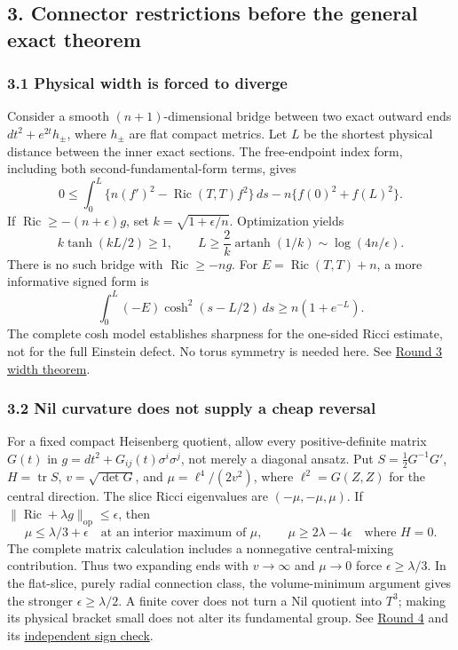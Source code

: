 \documentclass[
  english,
]{article}
\begin{document}
\hypertarget{connector-restrictions-before-the-general-exact-theorem}{%
\subsection{3. Connector restrictions before the general exact
theorem}\label{connector-restrictions-before-the-general-exact-theorem}}

\hypertarget{physical-width-is-forced-to-diverge}{%
\subsubsection{3.1 Physical width is forced to
diverge}\label{physical-width-is-forced-to-diverge}}

Consider a smooth \((n+1)\)-dimensional bridge between two exact outward
ends \(dt^2+e^{2t}h_\pm\), where \(h_\pm\) are flat compact metrics. Let
\(L\) be the shortest physical distance between the inner exact
sections. The free-endpoint index form, including both
second-fundamental-form terms, gives \[
 0\le\int_0^L\{n(f')^2-\operatorname{Ric}(T,T)f^2\}\,ds
       -n\{f(0)^2+f(L)^2\}.
\] If \(\operatorname{Ric}\ge-(n+\epsilon)g\), set
\(k=\sqrt{1+\epsilon/n}\). Optimization yields \[
 k\tanh(kL/2)\ge1,\qquad
 L\ge\frac2k\operatorname{artanh}(1/k)
       \sim\log(4n/\epsilon).
\] There is no such bridge with \(\operatorname{Ric}\ge-ng\). For
\(E=\operatorname{Ric}(T,T)+n\), a more informative signed form is \[
 \int_0^L(-E)\cosh^2(s-L/2)\,ds\ge n(1+e^{-L}).
\] The complete cosh model establishes sharpness for the one-sided Ricci
estimate, not for the full Einstein defect. No torus symmetry is needed
here. See \href{../proofs/round3_global.md}{Round 3 width theorem}.

\hypertarget{nil-curvature-does-not-supply-a-cheap-reversal}{%
\subsubsection{3.2 Nil curvature does not supply a cheap
reversal}\label{nil-curvature-does-not-supply-a-cheap-reversal}}

For a fixed compact Heisenberg quotient, allow every positive-definite
matrix \(G(t)\) in \(g=dt^2+G_{ij}(t)\sigma^i\sigma^j\), not merely a
diagonal ansatz. Put \(S=\frac12G^{-1}G'\), \(H=\operatorname{tr}S\),
\(v=\sqrt{\det G}\), and \(\mu=\ell^4/(2v^2)\), where \(\ell^2=G(Z,Z)\)
for the central direction. The slice Ricci eigenvalues are
\((-\mu,-\mu,\mu)\). If
\(\|\operatorname{Ric}+\lambda g\|_{\mathrm{op}}\le\epsilon\), then \[
 \mu\le\lambda/3+\epsilon\quad\text{at an interior maximum of }\mu,
 \qquad
 \mu\ge2\lambda-4\epsilon\quad\text{where }H=0.
\] The complete matrix calculation includes a nonnegative central-mixing
contribution. Thus two expanding ends with \(v\to\infty\) and
\(\mu\to0\) force \(\epsilon\ge\lambda/3\). In the flat-slice, purely
radial connection class, the volume-minimum argument gives the stronger
\(\epsilon\ge\lambda/2\). A finite cover does not turn a Nil quotient
into \(T^3\); making its physical bracket small does not alter its
fundamental group. See \href{../proofs/round4_global.md}{Round 4} and
its \href{../proofs/round4_global_all_sign_review.md}{independent sign
check}.
\end{document}
